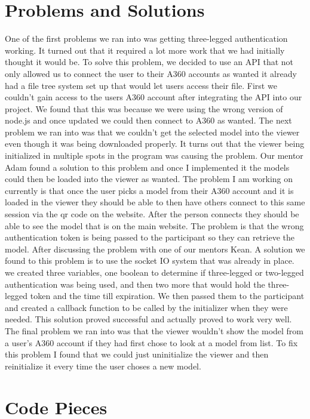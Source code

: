 \documentclass[10pt,draftclsnofoot,onecolumn]{IEEEtran}
\begin{document}
\section{Problems and Solutions}
One of the first problems we ran into was getting three-legged authentication working. It turned out that it required a lot more work that we had initially thought it would be. To solve this problem, we decided to use an API that not only allowed us to connect the user to their A360 accounts as wanted it already had a file tree system set up that would let users access their file. First we couldn't gain access to the users A360 account after integrating the API into our project. We found that this was because we were using the wrong version of node.js and once updated we could then connect to A360 as wanted. The next problem we ran into was that we couldn't get the selected model into the viewer even though it was being downloaded properly. It turns out that the viewer being initialized in multiple spots in the program was causing the problem. Our mentor Adam found a solution to this problem and once I implemented it the models could then be loaded into the viewer as wanted. The problem I am working on currently is that once the user picks a model from their A360 account and it is loaded in the viewer they should be able to then have others connect to this same session via the qr code on the website. After the person connects they should be able to see the model that is on the main website. The problem is that the wrong authentication token is being passed to the participant so they can retrieve the model. After discussing the problem with one of our mentors Kean. A solution we found to this problem is to use the socket IO system that was already in place. we created three variables, one boolean to determine if three-legged or two-legged authentication was being used, and then two more that would hold the three-legged token and the time till expiration. We then passed them to the participant and created a callback function to be called by the initializer when they were needed. This solution proved successful and actually proved to work very well. The final problem we ran into was that the viewer wouldn't show the model from a user’s A360 account if they had first chose to look at a model from list. To fix this problem I found that we could just uninitialize the viewer and then reinitialize it every time the user choses a new model.
\section{Code Pieces}
\end{document}
